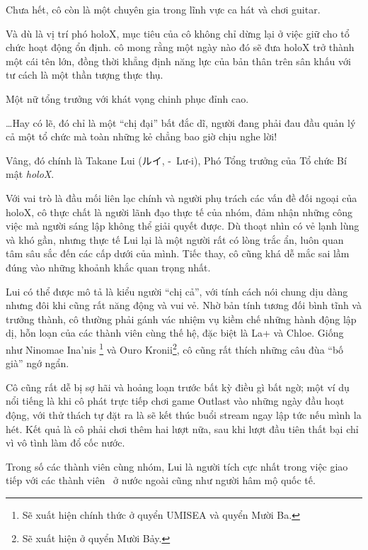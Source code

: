 \documentclass[../main.tex]{subfiles}
\begin{document}
Chưa hết, cô còn là một chuyên gia trong lĩnh vực ca hát và chơi guitar.

Và dù là vị trí phó holoX, mục tiêu của cô không chỉ dừng lại ở việc giữ cho tổ chức hoạt động ổn định. cô mong rằng một ngày nào đó sẽ đưa holoX trở thành một cái tên lớn, đồng thời khẳng định năng lực của bản thân trên sân khấu với tư cách là một thần tượng thực thụ.

Một nữ tổng trưởng với khát vọng chinh phục đỉnh cao.


\dots Hay có lẽ, đó chỉ là một ``chị đại'' bất đắc dĩ, người đang phải đau đầu quản lý cả một tổ chức mà toàn những kẻ chẳng bao giờ chịu nghe lời!

\chrint

Vâng, đó chính là Takane Lui (ルイ, -\ Lư-i), Phó Tổng trưởng của Tổ chức Bí mật \textit{holoX}.

Với vai trò là đầu mối liên lạc chính và người phụ trách các vấn đề đối ngoại của holoX, cô thực chất là người lãnh đạo thực tế của nhóm, đảm nhận những công việc mà người sáng lập không thể giải quyết được. Dù thoạt nhìn có vẻ lạnh lùng và khó gần, nhưng thực tế Lui lại là một người rất có lòng trắc ẩn, luôn quan tâm sâu sắc đến các cấp dưới của mình. Tiếc thay, cô cũng khá dễ mắc sai lầm đúng vào những khoảnh khắc quan trọng nhất.

Lui có thể được mô tả là kiểu người ``chị cả'', với tính cách nói chung dịu dàng nhưng đôi khi cũng rất năng động và vui vẻ. Nhờ bản tính tương đối bình tĩnh và trưởng thành, cô thường phải gánh vác nhiệm vụ kiềm chế những hành động lập dị, hỗn loạn của các thành viên cùng thế hệ, đặc biệt là La+ và Chloe. Giống như Ninomae Ina'nis \footnote{Sẽ xuất hiện chính thức ở quyển UMISEA và quyển Mười Ba.} và Ouro Kronii\footnote{Sẽ xuất hiện ở quyển Mười Bảy.}, cô cũng rất thích những câu đùa ``bố già'' ngớ ngẩn.

Cô cũng rất dễ bị sợ hãi và hoảng loạn trước bất kỳ điều gì bất ngờ; một ví dụ nổi tiếng là khi cô phát trực tiếp chơi game Outlast vào những ngày đầu hoạt động, với thử thách tự đặt ra là sẽ kết thúc buổi stream ngay lập tức nếu mình la hét. Kết quả là cô phải chơi thêm hai lượt nữa, sau khi lượt đầu tiên thất bại chỉ vì vô tình làm đổ cốc nước.

Trong số các thành viên cùng nhóm, Lui là người tích cực nhất trong việc giao tiếp với các thành viên \hll\ ở nước ngoài cũng như người hâm mộ quốc tế.
\end{document}
